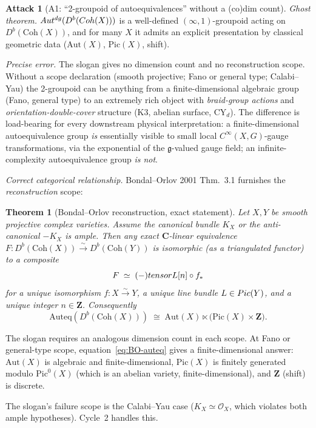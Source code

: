 \documentclass[11pt]{amsart}
\newtheorem{theorem}{Theorem}
\theoremstyle{definition}
\newtheorem{attack}{Attack}
\providecommand{\Coh}{\mathrm{Coh}}
\providecommand{\Aut}{\mathrm{Aut}}
\providecommand{\Auteq}{\mathrm{Auteq}}
\providecommand{\Autdg}{\mathrm{Aut}^{\rm dg}}
\providecommand{\Pic}{\mathrm{Pic}}
\providecommand{\fg}{\mathfrak{g}}
\providecommand{\cO}{\mathcal{O}}
\providecommand{\bC}{\mathbf{C}}
\providecommand{\bZ}{\mathbf{Z}}
\begin{document}
\begin{attack}[A1: ``2-groupoid of autoequivalences'' without a
(co)dim count]
\leavevmode

\noindent\emph{Ghost theorem.} $\Autdg(D^b(\Coh(X)))$ is a
well-defined $(\infty,1)$-groupoid acting on $D^b(\Coh(X))$, and for
many $X$ it admits an explicit presentation by classical geometric
data ($\Aut(X)$, $\Pic(X)$, shift).

\noindent\emph{Precise error.} The slogan gives no dimension count
and no reconstruction scope. Without a scope declaration (smooth
projective; Fano or general type; Calabi--Yau) the 2-groupoid can be
anything from a finite-dimensional algebraic group
(Fano, general type) to an extremely rich object with
\emph{braid-group actions} and \emph{orientation-double-cover}
structure (K3, abelian surface, CY$_d$). The difference is load-bearing
for every downstream physical interpretation: a finite-dimensional
autoequivalence group \emph{is} essentially visible to small local
$C^\infty(X, G)$-gauge transformations, via the exponential of the
$\fg$-valued gauge field; an infinite-complexity autoequivalence
group \emph{is not}.

\noindent\emph{Correct categorical relationship.} Bondal--Orlov 2001
Thm.~3.1 furnishes the \emph{reconstruction} scope:

\begin{theorem}[Bondal--Orlov reconstruction, exact statement]
\label{thm:BO}
Let $X, Y$ be smooth projective complex varieties. Assume the
canonical bundle $K_X$ or the anti-canonical $-K_X$ is ample. Then
any exact $\bC$-linear equivalence $F \colon D^b(\Coh(X))
\xrightarrow{\sim} D^b(\Coh(Y))$ is isomorphic (as a triangulated
functor) to a composite
\[
 F \;\simeq\; (-) tensor L[n] \circ f_*
\]
for a unique isomorphism $f \colon X \xrightarrow{\sim} Y$, a unique
line bundle $\cL \in \Pic(Y)$, and a unique integer $n \in \bZ$.
Consequently
\begin{equation}\label{eq:BO-auteq}
 \Auteq(D^b(\Coh(X))) \;\cong\; \Aut(X) \ltimes
 \bigl(\Pic(X) \times \bZ\bigr).
\end{equation}
\end{theorem}

The slogan requires an analogous dimension count in each scope.
At Fano or general-type scope, equation~\eqref{eq:BO-auteq} gives
a finite-dimensional answer: $\Aut(X)$ is algebraic and
finite-dimensional, $\Pic(X)$ is finitely generated modulo
$\Pic^0(X)$ (which is an abelian variety, finite-dimensional), and
$\bZ$ (shift) is discrete.

The slogan's failure scope is the Calabi--Yau case
($K_X \simeq \cO_X$, which violates both ample hypotheses). Cycle~2
handles this.
\end{attack}
\end{document}
